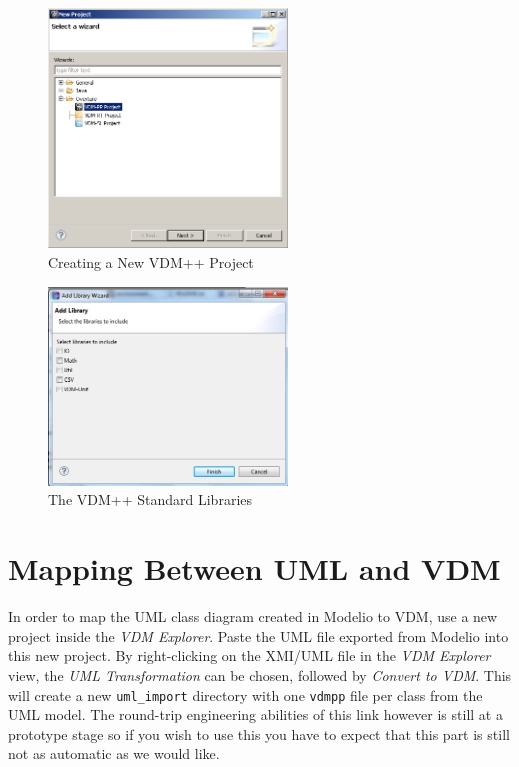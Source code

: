%
\begin{figure}[!htb]
\begin{center}
  \includegraphics[width=2.5in]{figures/newoverturePPproject}
  \caption[labelInTOC]{Creating a New VDM++ Project}
  \label{fig:newoverturePPproject}
\end{center}
\end{figure}
%
\begin{figure}[!htb]
\begin{center}
  \includegraphics[width=2.5in]{figures/stdlibs}
  \caption[labelInTOC]{The VDM++ Standard Libraries}
  \label{fig:stdlibs}
\end{center}
\end{figure}
%
\section{Mapping Between UML and  VDM}\label{sec:fromUMLtoVDM}\label{sec:syntaxcheck}
\label{sec:typecheck}
In order to map the UML class diagram created in Modelio
to VDM, use a new project inside the \emph{VDM Explorer}. Paste the UML file exported from Modelio into this new project.
By right-clicking on the XMI/UML file in the \emph{VDM Explorer} view, the \emph{UML Transformation} can be chosen, followed by \emph{Convert to VDM}. This will create a new \texttt{uml\_import} directory with one \texttt{vdmpp} file per class from the UML model.
The round-trip engineering abilities of this link however is still at a prototype stage so if you wish to use this you have to expect that this part is still not as automatic as we
would like.

